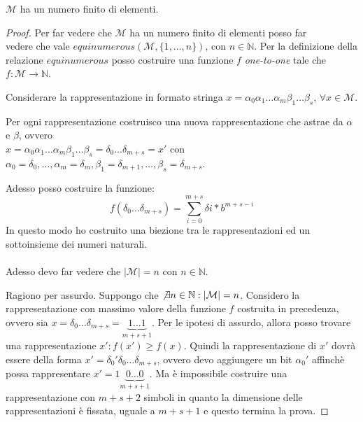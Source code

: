 \begin{exercise}[1.6]
$\mathcal{M}$ ha un numero finito di elementi.
\end{exercise}
\begin{proof}
Per far vedere che $\mathcal{M}$ ha un numero finito di elementi posso far \\
vedere che vale
$equinumerous(\mathcal{M}, \lbrace 1, \ldots, n\rbrace)$, con $n \in \mathbb{N}$.
Per la definizione della relazione $equinumerous$ posso costruire una funzione $f$
\emph{one-to-one} tale che $f: \mathcal{M} \rightarrow \mathbb{N}$.

Considerare la rappresentazione in formato stringa 
$x = \alpha_{0}\alpha_{1}\ldots\alpha_{m}\beta_{1}\ldots\beta_{s}$, $\forall x \in \mathcal{M}$.

Per ogni rappresentazione costruisco una nuova rappresentazione che astrae da $\alpha$ e $\beta$, 
ovvero \\$x = \alpha_{0}\alpha_{1}\ldots\alpha_{m}\beta_{1}\ldots\beta_{s} =
\delta_{0} \ldots \delta_{m + s} = x'$
con $\alpha_{0} = \delta_{0}, \ldots, \alpha_{m} = \delta_{m}, \beta_{1} = \delta_{m + 1}, \ldots, 
\beta_{s} = \delta_{m + s}$.

Adesso posso costruire la funzione:
\begin{displaymath}
f(\delta_{0} \ldots \delta_{m + s}) = \sum_{i = 0}^{m + s}{\delta{i} * b^{m + s - i}}
\end{displaymath}
In questo modo ho costruito una biezione tra le rappresentazioni ed un sottoinsieme 
dei numeri naturali. \\\\
Adesso devo far vedere che $|\mathcal{M}| = n$ con $n \in \mathbb{N}$.

Ragiono per assurdo. Suppongo che $\not \exists n \in \mathbb{N}: |\mathcal{M}| = n$.
Considero la rappresentazione con massimo valore della funzione $f$ costruita in precedenza,
ovvero sia $x = \delta_{0} \ldots \delta_{m + s} = \underbrace{1 \ldots 1}_{m+s+1}$.
Per le ipotesi di assurdo, allora posso trovare una rappresentazione $x':f(x') \geq f(x)$.
Quindi la rappresentazione di $x'$ dovr\`a essere della forma $x' = \delta_{0}' \delta_{0} 
\ldots \delta_{m + s}$,
ovvero devo aggiungere un bit $\alpha_{0}'$ affinch\`e possa rappresentare 
$x' = 1 \underbrace{0 \ldots 0}_{m+s+1}$. Ma \`e impossibile costruire una rappresentazione
con $m+s+2$ simboli in quanto la dimensione delle rappresentazioni \`e fissata, uguale a $m+s+1$ 
e questo termina la prova.

\end{proof}

